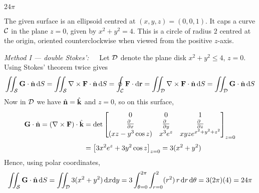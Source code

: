 \begin{answer} 
$24\pi$
\end{answer}


\begin{solution}
The given surface is an ellipsoid centred at $(x,y,z)=(0,0,1)$.
It caps a curve $\mathcal{C}$ in the plane $z=0$, given by $x^2+y^2=4$.
This is a circle of radius $2$ centred at the origin, oriented
counterclockwise when viewed from the positive $z$-axis.

\emph{Method I --- double Stokes':}\ \ \ 
Let $\mathcal{D}$ denote the plane disk $x^2+y^2\le 4$, $z=0$.
Using Stokes' theorem twice gives
$$
\iint_{\mathcal{S}} \mathbf{G}\cdot \hat{\mathbf{n}}\,\mathrm{d}S
= \iint_{\mathcal{S}} \nabla\times\mathbf{F}\cdot \hat{\mathbf{n}}\,\mathrm{d}S
= \oint_{\mathcal{C}} \mathbf{F}\cdot \mathrm{d}\mathbf{r}
= \iint_{\mathcal{D}} \nabla\times\mathbf{F}\cdot \hat{\mathbf{n}}\,\mathrm{d}S
= \iint_{\mathcal{D}} \mathbf{G}\cdot \hat{\mathbf{n}}\,\mathrm{d}S
$$
Now in $\mathcal{D}$ we have $\hat{\mathbf{n}}=\hat{\mathbf{k}}$ and $z=0$, so on this surface,
\begin{align*}
\vG\cdot\hn
= (\nabla\times\vF)\cdot\hk
&= \det\left[\begin{matrix} 0 & 0 & 1 \\
\frac{\partial\hfill}{\partial x} & \frac{\partial\hfill}{\partial y} & \frac{\partial\hfill}{\partial z} \\
(xz - y^3\cos z) & x^3 e^z & xyze^{x^2+y^2+z^2} \end{matrix}\right]_{z=0}
\\[0.05in]
&= \big[3x^2 e^z + 3y^2\cos z\big]_{z=0}
= 3(x^2+y^2)
\end{align*}
Hence, using polar coordinates,
$$
\iint_{\mathcal{S}} \mathbf{G}\cdot \hat{\mathbf{n}}\,\mathrm{d}S
= \iint_{\mathcal{D}} 3(x^2+y^2)\,\mathrm{d}x\mathrm{d}y
= 3\int_{\theta=0}^{2\pi} \int_{r=0}^2 (r^2)\,r\,\mathrm{d}r\,\mathrm{d}\theta
= 3(2\pi)(4)= 24\pi
$$


\end{solution}
